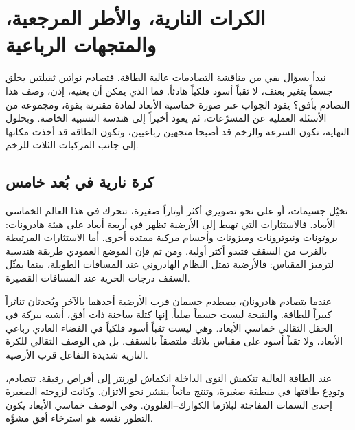 \chapter{الكرات النارية، والأطر المرجعية، والمتجهات الرباعية}

نبدأ بسؤال بقي من مناقشة التصادمات عالية الطاقة. فتصادم نواتين ثقيلتين يخلق جسماً يتغير بعنف، لا ثقباً أسود فلكياً هادئاً. فما الذي يمكن أن يعنيه، إذن، وصف هذا التصادم بأفق؟ يقود الجواب عبر صورة خماسية الأبعاد لمادة مقترنة بقوة، ومجموعة من الأسئلة العملية عن المسرّعات، ثم يعود أخيراً إلى هندسة النسبية الخاصة. وبحلول النهاية، تكون السرعة والزخم قد أصبحا متجهين رباعيين، وتكون الطاقة قد أخذت مكانها إلى جانب المركبات الثلاث للزخم.

\section{كرة نارية في بُعد خامس}

\begin{classroomqa}\end{classroomqa}

تخيّل جسيمات، أو على نحو تصويري أكثر أوتاراً صغيرة، تتحرك في هذا العالم الخماسي الأبعاد. فالاستثارات التي تهبط إلى الأرضية تظهر في أربعة أبعاد على هيئة هادرونات: بروتونات ونيوترونات وميزونات وأجسام مركبة ممتدة أخرى. أما الاستثارات المرتبطة بالقرب من السقف فتبدو أكثر أولية. ومن ثم فإن الموضع العمودي طريقة هندسية لترميز المقياس: فالأرضية تمثل النظام الهادروني عند المسافات الطويلة، بينما يمثّل السقف درجات الحرية عند المسافات القصيرة.

عندما يتصادم هادرونان، يصطدم جسمان قرب الأرضية أحدهما بالآخر ويُحدثان تناثراً كبيراً للطاقة. والنتيجة ليست جسماً صلباً. إنها كتلة ساخنة ذات أفق، أشبه ببركة في الحقل الثقالي خماسي الأبعاد. وهي ليست ثقباً أسود فلكياً في الفضاء العادي رباعي الأبعاد، ولا ثقباً أسود على مقياس بلانك ملتصقاً بالسقف. بل هي الوصف الثقالي للكرة النارية شديدة التفاعل قرب الأرضية.

عند الطاقة العالية تنكمش النوى الداخلة انكماش لورنتز إلى أقراص رقيقة. تتصادم، وتودِع طاقتها في منطقة صغيرة، وتنتج مائعاً ينتشر نحو الاتزان. وكانت لزوجته الصغيرة إحدى السمات المفاجئة لبلازما الكوارك--الغلوون. وفي الوصف خماسي الأبعاد يكون التطور نفسه هو استرخاء أفق مشوَّه.

